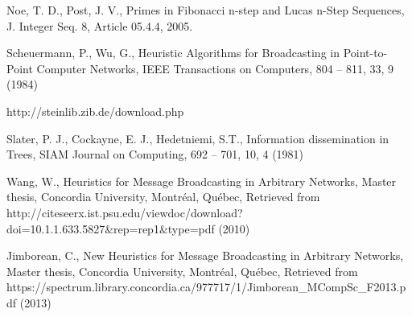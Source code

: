 \documentclass[preprint,12pt, review]{elsarticle}
\begin{document}
\begin{thebibliography}{}
Noe, T. D., Post, J. V., 
Primes in Fibonacci n-step and Lucas n-Step Sequences,
J. Integer Seq. 8, Article 05.4.4, 2005.

Scheuermann, P., Wu, G.,
Heuristic Algorithms for Broadcasting in Point-to-Point Computer Networks,
IEEE Transactions on Computers, 804 -- 811, 33, 9 (1984)

http://steinlib.zib.de/download.php

Slater, P. J., Cockayne, E. J., Hedetniemi, S.T.,
Information dissemination in Trees,
SIAM Journal on Computing, 692 -- 701, 10, 4 (1981)

Wang, W.,
Heuristics for Message Broadcasting in Arbitrary Networks,
Master thesis, Concordia University, Montr\'eal, Qu\'ebec, 
Retrieved from http://citeseerx.ist.psu.edu/viewdoc/download?doi=10.1.1.633.5827\&rep=rep1\&type=pdf (2010)

Jimborean, C.,
New Heuristics for Message Broadcasting in Arbitrary Networks,
Master thesis, Concordia University, Montr\'eal, Qu\'ebec, 
Retrieved from https://spectrum.library.concordia.ca/977717/1/Jimborean\_MCompSc\_F2013.pdf (2013)


\end{thebibliography}
\end{document}
